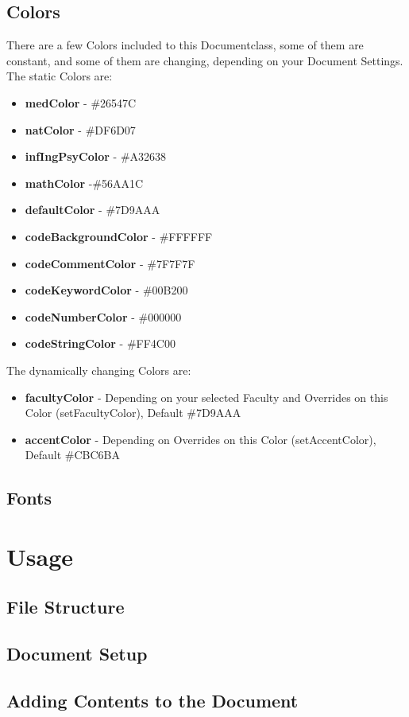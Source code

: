 \documentclass[a4paper]{../uulm-document}
\begin{document}
\subsection{Colors}
There are a few Colors included to this Documentclass, some of them are constant, and some of them are changing, depending on your Document Settings. 
The static Colors are:
\begin{itemize}
\item \textbf{medColor} - {\color{medColor}\#26547C}
\item \textbf{natColor} - {\color{natColor}\#DF6D07}
\item \textbf{infIngPsyColor} - {\color{infIngPsyColor}\#A32638}
\item \textbf{mathColor} -{\color{mathColor}\#56AA1C}
\item \textbf{defaultColor} - {\color{defaultColor}\#7D9AAA}
\item \textbf{codeBackgroundColor} - {\color{black}\#FFFFFF}
\item \textbf{codeCommentColor} - {\color{codeCommentColor}\#7F7F7F}
\item \textbf{codeKeywordColor} - {\color{codeKeywordColor}\#00B200}
\item \textbf{codeNumberColor} - {\color{codeNumberColor}\#000000}
\item \textbf{codeStringColor} - {\color{codeStringColor}\#FF4C00}
\end{itemize}
The dynamically changing Colors are:
\begin{itemize}
\item \textbf{facultyColor} - Depending on your selected Faculty and Overrides on this Color (setFacultyColor), Default {\color{defaultColor}\#7D9AAA}
\item \textbf{accentColor} - Depending on Overrides on this Color (setAccentColor), Default {\color{black}\#CBC6BA}
\end{itemize}

\subsection{Fonts}

\newpage

\section{Usage}
\subsection{File Structure}

\subsection{Document Setup}

\subsection{Adding Contents to the Document}
\end{document}
